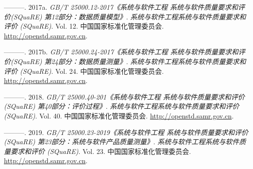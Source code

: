 \documentclass[hyperref, a4paper]{ctexart}
\begin{document}
\leavevmode\hypertarget{ref-innovative3}{}%
---------. 2017a. \emph{GB/T 25000.12-2017《系统与软件工程
系统与软件质量要求和评价(SQuaRE) 第12部分：数据质量模型》}.
\emph{系统与软件工程系统与软件质量要求和评价 (SQuaRE)}. Vol. 12.
中国国家标准化管理委员会. \url{http://openstd.samr.gov.cn}.

\leavevmode\hypertarget{ref-innovative4}{}%
---------. 2017b. \emph{GB/T 25000.24-2017《系统与软件工程
系统与软件质量要求和评价(SQuaRE) 第24部分：数据质量测量》}.
\emph{系统与软件工程系统与软件质量要求和评价 (SQuaRE)}. Vol. 24.
中国国家标准化管理委员会. \url{http://openstd.samr.gov.cn}.

\leavevmode\hypertarget{ref-innovative5}{}%
---------. 2018. \emph{GB/T 25000.40-201《系统与软件工程
系统与软件质量要求和评价(SQuaRE) 第40部分：评价过程》}.
\emph{系统与软件工程系统与软件质量要求和评价 (SQuaRE)}. Vol. 40.
中国国家标准化管理委员会. \url{http://openstd.samr.gov.cn}.

\leavevmode\hypertarget{ref-innovative2}{}%
---------. 2019. \emph{GB/T 25000.23-2019《系统与软件工程
系统与软件质量要求和评价(SQuaRE) 第23部分：系统与软件产品质量测量》}.
\emph{系统与软件工程系统与软件质量要求和评价 (SQuaRE)}. Vol. 23.
中国国家标准化管理委员会. \url{http://openstd.samr.gov.cn}.
\end{document}
